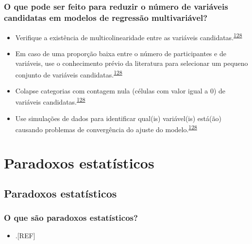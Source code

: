 \documentclass[
]{book}
\providecommand{\tightlist}{%
  \setlength{\itemsep}{0pt}\setlength{\parskip}{0pt}}
\begin{document}
\hypertarget{o-que-pode-ser-feito-para-reduzir-o-nuxfamero-de-variuxe1veis-candidatas-em-modelos-de-regressuxe3o-multivariuxe1vel}{%
\subsection{O que pode ser feito para reduzir o número de variáveis candidatas em modelos de regressão multivariável?}\label{o-que-pode-ser-feito-para-reduzir-o-nuxfamero-de-variuxe1veis-candidatas-em-modelos-de-regressuxe3o-multivariuxe1vel}}

\begin{itemize}
\item
  Verifique a existência de multicolinearidade entre as variáveis candidatas.\textsuperscript{\protect\hyperlink{ref-Sun1996}{128}}
\item
  Em caso de uma proporção baixa entre o número de participantes e de variáveis, use o conhecimento prévio da literatura para selecionar um pequeno conjunto de variáveis candidatas.\textsuperscript{\protect\hyperlink{ref-Sun1996}{128}}
\item
  Colapse categorias com contagem nula (células com valor igual a 0) de variáveis candidatas.\textsuperscript{\protect\hyperlink{ref-Sun1996}{128}}
\item
  Use simulações de dados para identificar qual(is) variável(is) está(ão) causando problemas de convergência do ajuste do modelo.\textsuperscript{\protect\hyperlink{ref-Sun1996}{128}}
\end{itemize}

\hypertarget{paradoxos-estatisticos}{%
\chapter{\texorpdfstring{\textbf{Paradoxos estatísticos}}{Paradoxos estatísticos}}\label{paradoxos-estatisticos}}

\hypertarget{paradoxos}{%
\section{Paradoxos estatísticos}\label{paradoxos}}

\hypertarget{o-que-suxe3o-paradoxos-estatuxedsticos}{%
\subsection{O que são paradoxos estatísticos?}\label{o-que-suxe3o-paradoxos-estatuxedsticos}}

\begin{itemize}
\tightlist
\item
  .{[}REF{]}
\end{itemize}
\end{document}
